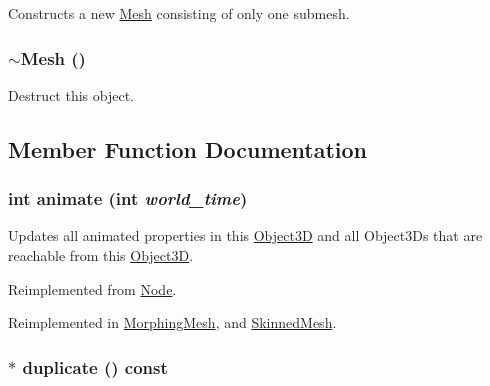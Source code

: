 Constructs a new \hyperlink{classm3g_1_1Mesh}{Mesh} consisting of only one submesh. \hypertarget{classm3g_1_1Mesh_6e26384cfb03023e7dc2e5419baf813f}{
\subsubsection[{$\sim$Mesh}]{\setlength{\rightskip}{0pt plus 5cm}$\sim${\bf Mesh} ()}}
\label{classm3g_1_1Mesh_6e26384cfb03023e7dc2e5419baf813f}


Destruct this object. 

\subsection{Member Function Documentation}
\hypertarget{classm3g_1_1Mesh_8aad1ceab4c2a03609c8a42324ce484d}{
\subsubsection[{animate}]{\setlength{\rightskip}{0pt plus 5cm}int animate (int {\em world\_\-time})}}
\label{classm3g_1_1Mesh_8aad1ceab4c2a03609c8a42324ce484d}


Updates all animated properties in this \hyperlink{classm3g_1_1Object3D}{Object3D} and all Object3Ds that are reachable from this \hyperlink{classm3g_1_1Object3D}{Object3D}. 

Reimplemented from \hyperlink{classm3g_1_1Node_8aad1ceab4c2a03609c8a42324ce484d}{Node}.

Reimplemented in \hyperlink{classm3g_1_1MorphingMesh_8aad1ceab4c2a03609c8a42324ce484d}{MorphingMesh}, and \hyperlink{classm3g_1_1SkinnedMesh_8aad1ceab4c2a03609c8a42324ce484d}{SkinnedMesh}.\hypertarget{classm3g_1_1Mesh_52ce6d0b3eda2bd3a95bfb5b7dbb6f82}{
\subsubsection[{duplicate}]{ $\ast$ duplicate () const}}
\label{classm3g_1_1Mesh_52ce6d0b3eda2bd3a95bfb5b7dbb6f82}


